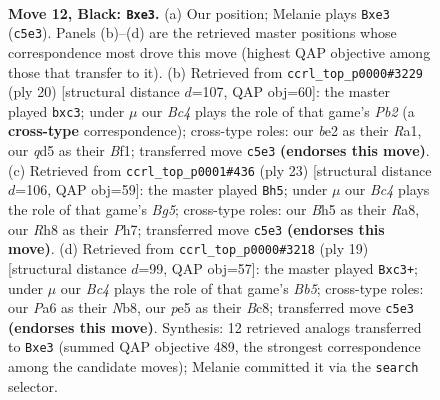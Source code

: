 \documentclass[11pt]{article}
\begin{document}
\clearpage

\begin{figure}[p]\centering
\begin{subfigure}{0.46\textwidth}\centering
\resizebox{\linewidth}{!}{%
\newchessgame
\chessboard[
  setfen={rn2k1nr/1p3ppp/pq6/2bQP2b/7P/1P2BN2/P3BPP1/RN2K2R b KQkq - 0 12},
  showmover=false,
  pgfstyle=straightmove, color=movearrow, markmove={c5-e3}
]}
\caption{}
\end{subfigure}\hfill
\begin{subfigure}{0.46\textwidth}\centering
\resizebox{\linewidth}{!}{%
\newchessgame
\chessboard[
  setfen={rn1qk2r/pp3pp1/4bn1p/3p4/2pP3B/P1b1P3/1P1N1PPP/R2QKB1R w KQkq - 0 11},
  showmover=false,
  pgfstyle=straightmove, color=movearrow, markmove={b2-c3}
]}
\caption{}
\end{subfigure}
\\[4pt]
\begin{subfigure}{0.46\textwidth}\centering
\resizebox{\linewidth}{!}{%
\newchessgame
\chessboard[
  setfen={r3k1nr/3q1ppp/p1p5/2bpP3/Q5b1/5N1P/PP1N1PP1/R1B1K2R b KQkq - 0 12},
  showmover=false,
  pgfstyle=straightmove, color=movearrow, markmove={g4-h5}
]}
\caption{}
\end{subfigure}\hfill
\begin{subfigure}{0.46\textwidth}\centering
\resizebox{\linewidth}{!}{%
\newchessgame
\chessboard[
  setfen={rnb2rk1/pp3pp1/5q1p/2Pp4/1b6/1QN1PN2/PP3PPP/R3KB1R b KQ - 0 10},
  showmover=false,
  pgfstyle=straightmove, color=movearrow, markmove={b4-c3}
]}
\caption{}
\end{subfigure}
\caption{\textbf{Move 12, Black: \texttt{Bxe3}.} (a) Our position; Melanie plays \texttt{Bxe3} (\texttt{c5e3}). Panels (b)--(d) are the retrieved master positions whose correspondence most drove this move (highest QAP objective among those that transfer to it). (b) Retrieved from \texttt{ccrl\_top\_p0000\#3229} (ply 20) [structural distance $d$=107, QAP obj=60]: the master played \texttt{bxc3}; under $\mu$ our \emph{Bc4} plays the role of that game's \emph{Pb2} (a \textbf{cross-type} correspondence); cross-type roles: our \emph{b}e2 as their \emph{R}a1, our \emph{q}d5 as their \emph{B}f1; transferred move \texttt{c5e3} \textbf{(endorses this move)}. (c) Retrieved from \texttt{ccrl\_top\_p0001\#436} (ply 23) [structural distance $d$=106, QAP obj=59]: the master played \texttt{Bh5}; under $\mu$ our \emph{Bc4} plays the role of that game's \emph{Bg5}; cross-type roles: our \emph{B}h5 as their \emph{R}a8, our \emph{R}h8 as their \emph{P}h7; transferred move \texttt{c5e3} \textbf{(endorses this move)}. (d) Retrieved from \texttt{ccrl\_top\_p0000\#3218} (ply 19) [structural distance $d$=99, QAP obj=57]: the master played \texttt{Bxc3+}; under $\mu$ our \emph{Bc4} plays the role of that game's \emph{Bb5}; cross-type roles: our \emph{P}a6 as their \emph{N}b8, our \emph{p}e5 as their \emph{B}c8; transferred move \texttt{c5e3} \textbf{(endorses this move)}. Synthesis: 12 retrieved analogs transferred to \texttt{Bxe3} (summed QAP objective 489, the strongest correspondence among the candidate moves); Melanie committed it via the \texttt{search} selector.}
\label{fig:thought-m23}
\end{figure}
\end{document}
